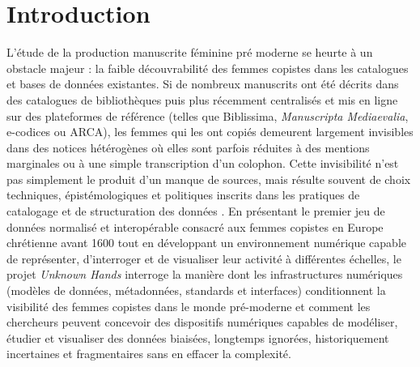 \documentclass[final, fra]{anthology-ch}      %
\begin{document}
\section{Introduction} 
L’étude de la production manuscrite féminine pré moderne \cite{Beach2004WomenAsScribes, Cyrus2009ScribesConvents, Moreton2013NunBookProduction, Blanton2013HullDialogue, Blanton2015KansasCityDialogue, Blanton2018AntwerpDialogue} se heurte à un obstacle majeur : la faible découvrabilité des femmes copistes dans les catalogues et bases de données existantes. Si de nombreux manuscrits ont été décrits dans des catalogues de bibliothèques puis plus récemment centralisés et mis en ligne sur des plateformes de référence (telles que Biblissima, \textit{Manuscripta Mediaevalia}, e-codices ou ARCA), les femmes qui les ont copiés demeurent largement invisibles dans des notices hétérogènes où elles sont parfois réduites à des mentions marginales ou à une simple transcription d’un colophon. Cette invisibilité n’est pas simplement le produit d’un manque de sources, mais résulte souvent de choix techniques, épistémologiques et politiques inscrits dans les pratiques de catalogage et de structuration des données \cite{Thylstrup2019PoliticsDigitization, RisamBordalejo2019IntersectionalityDH, Manoff2016ArchivalSilence, Cook2011ArchivalAppraisal, Zaagsma2022PoliticsDigitization}. En présentant le premier jeu de données normalisé et interopérable consacré aux femmes copistes en Europe chrétienne avant 1600 tout en développant un environnement numérique capable de représenter, d’interroger et de visualiser leur activité à différentes échelles, le projet \textit{Unknown Hands} interroge la manière dont les infrastructures numériques (modèles de données, métadonnées, standards et interfaces) conditionnent la visibilité des femmes copistes dans le monde pré-moderne et comment les chercheurs peuvent concevoir des dispositifs numériques capables de modéliser, étudier et visualiser des données biaisées, longtemps ignorées, historiquement incertaines et fragmentaires sans en effacer la complexité.
\end{document}
